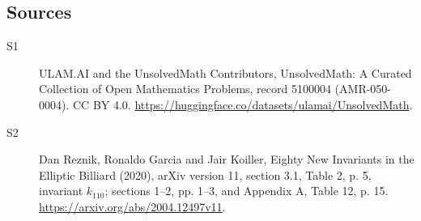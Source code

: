 \documentclass[11pt]{article}
\begin{document}
\subsection{Sources}
\begin{description}
\item[\hypertarget{source:5100004:1}{S1}] ULAM.AI and the UnsolvedMath Contributors, UnsolvedMath: A Curated Collection of Open Mathematics Problems, record 5100004 (AMR-050-0004). CC BY 4.0. \url{https://huggingface.co/datasets/ulamai/UnsolvedMath}.
\item[\hypertarget{source:5100004:2}{S2}] Dan Reznik, Ronaldo Garcia and Jair Koiller, Eighty New Invariants in the Elliptic Billiard (2020), arXiv version 11, section 3.1, Table 2, p. 5, invariant $k_{110}$; sections 1--2, pp. 1--3, and Appendix A, Table 12, p. 15. \url{https://arxiv.org/abs/2004.12497v11}.
\end{description}
\label{end:5100004}
\end{document}
